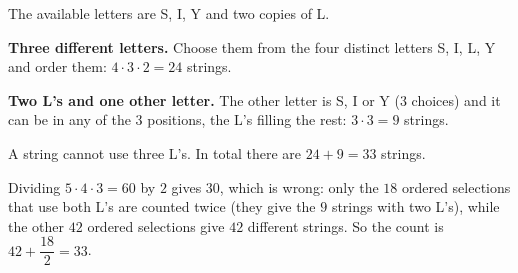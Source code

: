The available letters are S, I, Y and two copies of L.

\textbf{Three different letters.} Choose them from the four distinct letters S, I, L, Y and order them: $4\cdot3\cdot2=24$ strings.

\textbf{Two L's and one other letter.} The other letter is S, I or Y ($3$ choices) and it can be in any of the $3$ positions, the L's filling the rest: $3\cdot3=9$ strings.

A string cannot use three L's. In total there are $24+9=\boxed{33}$ strings.

Dividing $5\cdot4\cdot3=60$ by $2$ gives $30$, which is wrong: only the $18$ ordered selections that use both L's are counted twice (they give the $9$ strings with two L's), while the other $42$ ordered selections give $42$ different strings. So the count is $42+\dfrac{18}{2}=33$.
